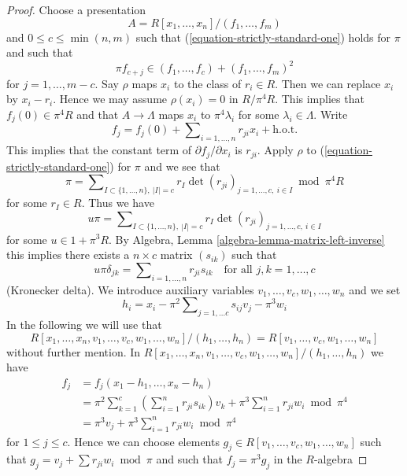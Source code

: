 \begin{proof}
Choose a presentation
$$
A = R[x_1, \ldots, x_n]/(f_1, \ldots, f_m)
$$
and $0 \leq c \leq \min(n, m)$ such that
(\ref{equation-strictly-standard-one}) holds for $\pi$ and such that
\begin{equation}
\label{equation-star}
\pi f_{c + j} \in (f_1, \ldots, f_c) + (f_1, \ldots, f_m)^2
\end{equation}
for $j = 1, \ldots, m - c$. Say $\rho$ maps $x_i$ to the class of
$r_i \in R$. Then we can replace $x_i$ by $x_i - r_i$. Hence we may
assume $\rho(x_i) = 0$ in $R/\pi^4 R$. This implies that
$f_j(0) \in \pi^4R$ and that $A \to \Lambda$ maps $x_i$
to $\pi^4\lambda_i$ for some $\lambda_i \in \Lambda$. Write
$$
f_j = f_j(0) + \sum\nolimits_{i = 1, \ldots, n} r_{ji} x_i + \text{h.o.t.}
$$
This implies that the constant term of $\partial f_j/\partial x_i$ is
$r_{ji}$. Apply $\rho$ to (\ref{equation-strictly-standard-one})
for $\pi$ and we see that
$$
\pi = \sum\nolimits_{I \subset \{1, \ldots, n\},\ |I| = c}
r_I \det(r_{ji})_{j = 1, \ldots, c,\ i \in I} \bmod \pi^4R
$$
for some $r_I \in R$. Thus we have
$$
u\pi = \sum\nolimits_{I \subset \{1, \ldots, n\},\ |I| = c}
r_I \det(r_{ji})_{j = 1, \ldots, c,\ i \in I}
$$
for some $u \in 1 + \pi^3R$. By
Algebra, Lemma \ref{algebra-lemma-matrix-left-inverse}
this implies there exists a $n \times c$ matrix $(s_{ik})$ such that
$$
u\pi \delta_{jk} = \sum\nolimits_{i = 1, \ldots, n} r_{ji}s_{ik}\quad
\text{for all } j, k = 1, \ldots, c
$$
(Kronecker delta). We introduce auxiliary variables
$v_1, \ldots, v_c, w_1, \ldots, w_n$ and we set
$$
h_i = x_i - \pi^2 \sum\nolimits_{j = 1, \ldots c} s_{ij} v_j - \pi^3 w_i
$$
In the following we will use that
$$
R[x_1, \ldots, x_n, v_1, \ldots, v_c, w_1, \ldots, w_n]/
(h_1, \ldots, h_n) = R[v_1, \ldots, v_c, w_1, \ldots, w_n]
$$
without further mention. In
$R[x_1, \ldots, x_n, v_1, \ldots, v_c, w_1, \ldots, w_n]/
(h_1, \ldots, h_n)$ we have
\begin{align*}
f_j & = f_j(x_1 - h_1, \ldots, x_n - h_n) \\
& =
\pi^2 \sum\nolimits_{k = 1}^c
\left(\sum\nolimits_{i = 1}^n r_{ji} s_{ik}\right) v_k
+
\pi^3 \sum\nolimits_{i = 1}^n r_{ji}w_i \bmod \pi^4 \\
& =
\pi^3 v_j + \pi^3 \sum\nolimits_{i = 1}^n r_{ji}w_i \bmod \pi^4
\end{align*}
for $1 \leq j \leq c$. Hence we can choose elements
$g_j \in R[v_1, \ldots, v_c, w_1, \ldots, w_n]$
such that $g_j = v_j + \sum r_{ji}w_i \bmod \pi$
and such that $f_j = \pi^3 g_j$ in the $R$-algebra

\end{proof}
